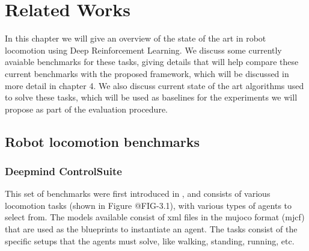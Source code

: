 
\chapter{Related Works}
\label{ch:relatedWorks}



In this chapter we will give an overview of the state of the art in robot locomotion using 
Deep Reinforcement Learning. We discuss some currently avaiable benchmarks for these tasks,
giving details that will help compare these current benchmarks with the proposed framework, which
will be discussed in more detail in chapter 4. We also discuss current state of the art algorithms
used to solve these tasks, which will be used as baselines for the experiments we will propose as part
of the evaluation procedure.

\section{Robot locomotion benchmarks}

\subsection{Deepmind ControlSuite}

This set of benchmarks were first introduced in \cite{Controlsuite}, and consists 
of various locomotion tasks (shown in Figure @FIG-3.1), with various types of agents 
to select from. The models available consist of xml files in the mujoco format (mjcf) 
that are used as the blueprints to instantiate an agent. The tasks consist of the specific
setups that the agents must solve, like walking, standing, running, etc.

